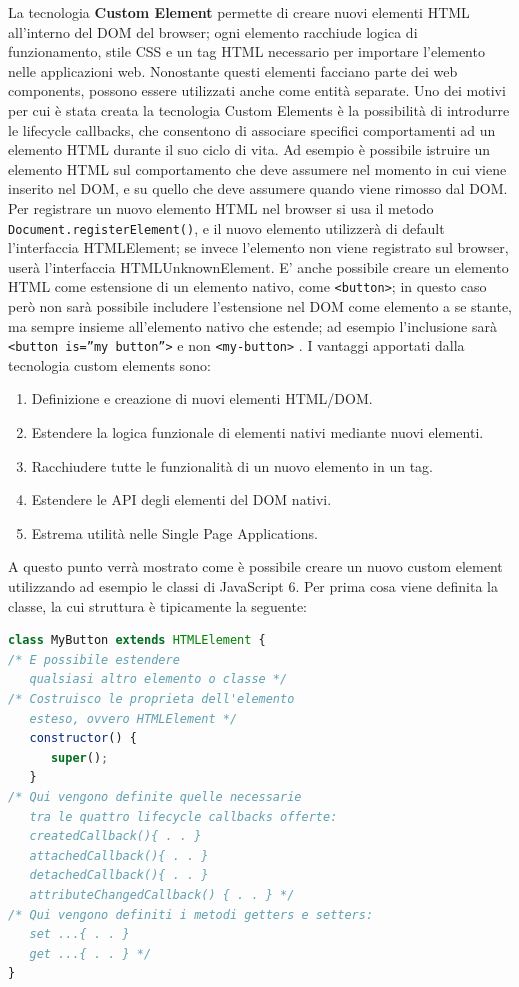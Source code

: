 La tecnologia \textbf{Custom Element} permette di creare nuovi elementi HTML all’interno del DOM del browser; ogni elemento racchiude logica di funzionamento, stile CSS e un tag HTML necessario per importare l’elemento nelle applicazioni web. 
Nonostante questi elementi facciano parte dei web components, possono essere utilizzati anche come entità separate. Uno dei motivi per cui è stata creata la tecnologia Custom Elements è la possibilità di introdurre le lifecycle callbacks, che consentono di associare specifici comportamenti ad un elemento HTML durante il suo ciclo di vita. Ad esempio è possibile istruire un elemento HTML sul comportamento che deve assumere nel momento in cui viene inserito nel DOM, e su quello che deve assumere quando viene rimosso dal DOM. 
Per registrare un nuovo elemento HTML nel browser si usa il metodo \texttt{Document.registerElement()}, e il nuovo elemento utilizzerà di default l’interfaccia HTMLElement; se invece l’elemento non viene registrato sul browser, userà l’interfaccia HTMLUnknownElement. E’ anche possibile creare un elemento HTML come estensione di un elemento nativo, come \texttt{<button>}; in questo caso però non sarà possibile includere l’estensione nel DOM come elemento a se stante, ma sempre insieme all’elemento nativo che estende; ad esempio l’inclusione sarà \texttt{<button is=”my button”>} e non \texttt{<my-button>} .
I vantaggi apportati dalla tecnologia custom elements sono:
\begin{enumerate}
\item Definizione e creazione di nuovi elementi HTML/DOM.
\item Estendere la logica funzionale di elementi nativi mediante nuovi elementi.
\item Racchiudere tutte le funzionalità di un nuovo elemento in un tag.
\item Estendere le API degli elementi del DOM nativi.
\item Estrema utilità nelle Single Page Applications.
\end{enumerate}
A questo punto verrà mostrato come è possibile creare un nuovo custom element utilizzando ad esempio le classi di JavaScript 6.
Per prima cosa viene definita la classe, la cui struttura è tipicamente la seguente:
\begin{lstlisting}[language=JavaScript]
class MyButton extends HTMLElement {    
/* E possibile estendere 
   qualsiasi altro elemento o classe */
/* Costruisco le proprieta dell'elemento 
   esteso, ovvero HTMLElement */     
   constructor() {          
      super();                         
   }   								  
/* Qui vengono definite quelle necessarie 
   tra le quattro lifecycle callbacks offerte:
   createdCallback(){ . . } 
   attachedCallback(){ . . } 
   detachedCallback(){ . . } 
   attributeChangedCallback() { . . } */
/* Qui vengono definiti i metodi getters e setters:
   set ...{ . . } 
   get ...{ . . } */
}
\end{lstlisting}
